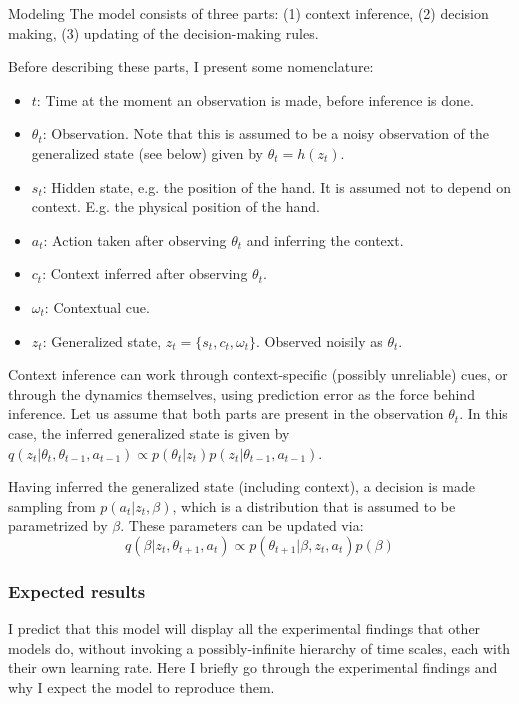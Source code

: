 \documentclass{report}
\begin{document}
\begin{chapter}{Modeling}
The model consists of three parts: (1) context inference, (2) decision making,
(3) updating of the decision-making rules.

Before describing these parts, I present some nomenclature:
\begin{itemize}
\item $t$: Time at the moment an observation is made, before inference is done.
\item $\theta_t$: Observation. Note that this is assumed to be a noisy
observation of the generalized state (see below) given by $\theta_t = h(z_t)$.
\item $s_t$: Hidden state, e.g. the position of the hand. It is assumed not to
depend on context. E.g. the physical position of the hand.
\item $a_t$: Action taken after observing $\theta_t$ and inferring the context.
\item $c_t$: Context inferred after observing $\theta_t$.
\item $\omega_t$: Contextual cue.
\item $z_t$: Generalized state, $z_t = \{s_t, c_t, \omega_t\}$. Observed noisily
as $\theta_t$.
\end{itemize}

Context inference can work through context-specific (possibly unreliable) cues,
or through the dynamics themselves, using prediction error as the force behind
inference. Let us assume that both parts are present in the observation
$\theta_t$. In this case, the inferred generalized state is given by
$q(z_t | \theta_t, \theta_{t-1}, a_{t-1}) \propto p(\theta_t |
z_t)p(z_t|\theta_{t-1}, a_{t-1})$.

Having inferred the generalized state (including context), a decision is made
sampling from $p(a_t | z_t, \beta)$, which is a distribution that is assumed to
be parametrized by $\beta$. These parameters can be updated via:
\[
q(\beta | z_t, \theta_{t+1}, a_t) \propto p(\theta_{t+1} | \beta, z_t,
a_t)p(\beta) \label{eqn:update-parameters}
\]

\subsubsection{Expected results}
I predict that this model will display all the experimental findings that other
models do, without invoking a possibly-infinite hierarchy of time scales, each
with their own learning rate. Here I briefly go through the experimental
findings and why I expect the model to reproduce them.


\end{chapter}
\end{document}
